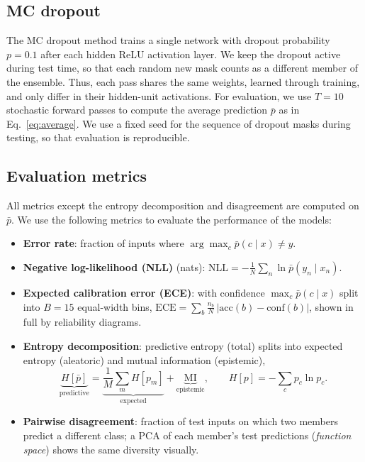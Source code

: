 \documentclass[10pt]{article}
\begin{document}
\subsection{MC dropout}

The MC dropout method trains a single network with dropout probability $p=0.1$ after each hidden ReLU activation layer. 
We keep the dropout active during test time, so that each random new mask counts as a different member of the ensemble.
Thus, each pass shares the same weights, learned through training, and only differ in their hidden-unit activations. 
For evaluation, we use $T=10$ stochastic forward passes to compute the average prediction $\bar p$ as in Eq.~\eqref{eq:average}.
We use a fixed seed for the sequence of dropout masks during testing, so that evaluation is reproducible. 



\subsection{Evaluation metrics}

All metrics except the entropy decomposition and disagreement are computed on $\bar p$.
We use the following metrics to evaluate the performance of the models:
\begin{itemize}
  \item \textbf{Error rate}: fraction of inputs where $\arg\max_c \bar p(c \mid x) \ne y$.
  \item \textbf{Negative log-likelihood (NLL)} (nats): $\mathrm{NLL} = -\frac{1}{N}\sum_{n} \ln \bar p(y_n \mid x_n)$.
  \item \textbf{Expected calibration error (ECE)}: with confidence $\max_c \bar p(c \mid x)$ split into $B=15$ equal-width bins,
    $\mathrm{ECE} = \sum_{b} \frac{n_b}{N}\,\lvert \mathrm{acc}(b) - \mathrm{conf}(b) \rvert$, shown in full by reliability diagrams.
  \item \textbf{Entropy decomposition}: predictive entropy (total) splits into expected entropy (aleatoric) and mutual information (epistemic),
    \begin{equation}
      \underbrace{H[\bar p]}_{\text{predictive}} = \underbrace{\frac{1}{M}\sum_m H[p_m]}_{\text{expected}} + \underbrace{\mathrm{MI}}_{\text{epistemic}},
      \qquad H[p] = -\sum_c p_c \ln p_c .
    \end{equation}
  \item \textbf{Pairwise disagreement}: fraction of test inputs on which two members predict a different class; a PCA of each member's test predictions (\emph{function space}) shows the same diversity visually.
\end{itemize}
\end{document}
